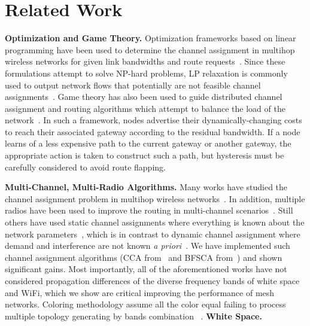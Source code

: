 \section{Related Work}
\label{sec:related}

{\bf Optimization and Game Theory.} Optimization frameworks based on linear programming
have been used to determine the channel assignment in multihop wireless networks for given 
link bandwidths and route requests~\cite{tang2005interference}.  Since these formulations 
attempt to solve NP-hard problems, LP relaxation is commonly used to output network flows 
that potentially are not feasible channel assignments~\cite{si2010overview}. 
Game theory has also been used to guide distributed channel assignment and routing 
algorithms which attempt to balance the load of the network~\cite{raniwala2005architecture,
wang2010game}.  In such a framework, nodes advertise their dynamically-changing costs 
to reach their associated gateway according to the residual bandwidth. If a node learns of
a less expensive path to the current gateway or another gateway, the appropriate action is
taken to construct such a path, but hysteresis must be carefully considered to avoid route flapping.

{\bf Multi-Channel, Multi-Radio Algorithms.} Many works have studied the channel assignment problem in multihop wireless
networks~\cite{jain2005impact,akyildiz2005wireless,raniwala2004centralized}.
In addition, multiple radios have been used to improve the routing in multi-channel
scenarios~\cite{draves2004routing}. Still others have used static channel assignments
where everything is known about the network parameters~\cite{subramanian2008minimum},
which is in contrast to dynamic channel assignment where demand and interference are 
not known {\it a priori}~\cite{wu2006analysis,ramachandran2006interference}. 
We have implemented such channel assignment algorithms (CCA from~\cite{draves2004routing} and 
BFSCA from~\cite{ramachandran2006interference}) and shown significant gains.  
Most importantly, all of the aforementioned works have not considered propagation 
differences of the diverse frequency bands of white space and WiFi, which we show are 
critical improving the performance of mesh networks.
% 
Coloring methodology assume all the color equal failing to process multiple topology generating by bands combination ~\cite{marina2010topology}. 
% 
{\bf White Space.} 



